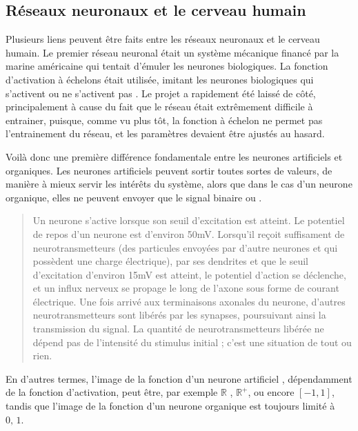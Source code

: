 \documentclass[letterpaper,10pt,french]{sphinxmanual}
\begin{document}
\subsection{Réseaux neuronaux et le cerveau humain}
\label{\detokenize{notions_de_base:reseaux-neuronaux-et-le-cerveau-humain}}
Plusieurs liens peuvent être faits entre les réseaux neuronaux et le cerveau humain. Le premier réseau neuronal était un
système mécanique financé par la marine américaine qui tentait d’émuler les neurones biologiques. La fonction d’activation
à échelons était utilisée, imitant les neurones biologiques qui s’activent  ou ne s’activent pas . Le projet a rapidement
été laissé de côté, principalement à cause du fait que le réseau était extrêmement difficile à entrainer, puisque, comme vu plus
tôt, la fonction à échelon ne permet pas l’entrainement du réseau, et les paramètres devaient être ajustés au hasard.

Voilà donc une première différence fondamentale entre les neurones artificiels et organiques. Les neurones artificiels peuvent
sortir toutes sortes de valeurs, de manière à mieux servir les intérêts du système, alors que dans le cas d’un neurone organique,
elles ne peuvent envoyer que le signal binaire  ou .
\begin{quote}

Un neurone s’active lorsque son seuil d’excitation est atteint. Le potentiel de repos d’un neurone est d’environ \sphinxhyphen{}50mV. Lorsqu’il
reçoit suffisament de neurotransmetteurs (des particules envoyées par d’autre neurones et qui possèdent une charge électrique), par
ses dendrites et que le seuil d’excitation d’environ 15mV est atteint, le potentiel d’action se déclenche, et un influx nerveux se propage
le long de l’axone sous forme de courant électrique. Une fois arrivé aux terminaisons axonales du neurone, d’autres neurotransmetteurs sont
libérés par les synapses, poursuivant ainsi la transmission du signal. La quantité de neurotransmetteurs libérée ne dépend pas de l’intensité
du stimulus initial ; c’est une situation de tout ou rien. 
\end{quote}

En d’autres termes, l’image de la fonction d’un neurone artificiel , dépendamment de la fonction d’activation, peut être,
par exemple \(\mathbb{R}\) , \(\mathbb{R^+}\), ou encore \([-1, 1]\),
tandis que l’image de la fonction d’un neurone organique  est toujours limité à \(\text{{0, 1}}\).
\end{document}
